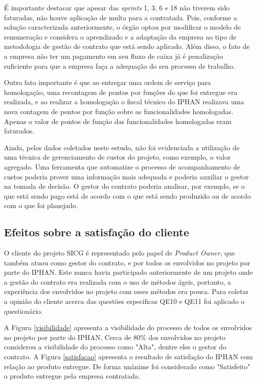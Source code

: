 É importante destacar que apesar das \textit{sprints} 1, 3, 6 e 18 não tiverem sido faturadas, não houve aplicação de multa para a contratada. Pois, conforme a solução caracterizada anteriormente, o órgão optou por modificar o modelo de remuneração e considera o aprendizado e a adaptação da empresa ao tipo de metodologia de gestão de contrato que está sendo aplicado. Além disso, o fato de a empresa não ter um pagamento em seu fluxo de caixa já é penalização suficiente para que a empresa faça a adequação do seu processo de trabalho.

Outro fato importante é que ao entregar uma ordem de serviço para homologação, uma recontagem de pontos por funções do que foi entregue era realizada, e ao realizar a homologação o fiscal técnico do IPHAN realizava uma nova contagem de pontos por função sobre as funcionalidades homologadas. Apenas o valor de pontos de função das funcionalidades homologadas eram faturados. 

Ainda, pelos dados coletados neste estudo, não foi evidenciada a utilização de uma técnica de gerenciamento de custos do projeto, como exemplo, o valor agregado. Uma ferramenta que automatize o processo de acompanhamento de custos poderia prover uma informação mais adequada e poderia auxiliar o gestor na tomada de decisão. O gestor do contrato poderia analisar, por exemplo, se o que está sendo pago está de acordo com o que está sendo produzido ou de acordo com o que foi planejado.

\subsection[Efeitos sobre a satisfação do cliente]{Efeitos sobre a satisfação do cliente}

O cliente do projeto SICG é representado pelo papel de \textit{Product Owner}, que também atuou como gestor do contrato, e por todos os envolvidos no projeto por parte do IPHAN. Este nunca havia participado anteriormente de um projeto onde a gestão do contrato era realizada com o uso de métodos ágeis, portanto, a experiência dos envolvidos no projeto com esses métodos era pouca. Para coletar a opinião do cliente acerca das questões específicas QE10  e QE11 foi aplicado o questionário.

A Figura \ref{visibilidade} apresenta a visibilidade do processo de todos os envolvidos no projeto por parte do IPHAN. Cerca de 80\% dos envolvidos no projeto considerou a visibilidade do processo como "Alta", dentre eles o gestor do contrato. A Figura \ref{satisfacao} apresenta o resultado de satisfação do IPHAN com relação ao produto entregue. De forma unânime foi considerado como "Satisfeito" o produto entregue pela empresa contratada. 


